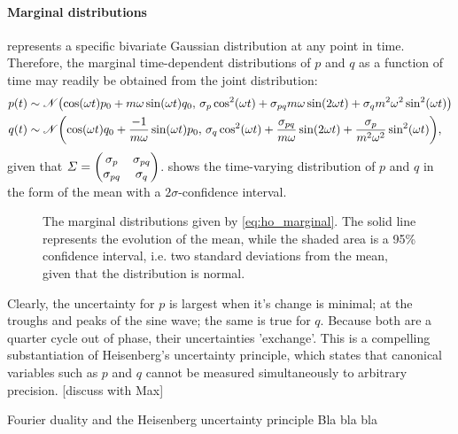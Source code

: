 \paragraph{Marginal distributions}  represents a specific bivariate Gaussian distribution at any point in time. Therefore, the marginal time-dependent distributions of $p$ and $q$ as a function of time may readily be obtained from the joint distribution: \cite{Schon2011}
\begin{equation}
    \begin{split}
        p(t) &\sim \mathscr{N}\qty(\cos(\omega t)p_0 + m\omega\sin(\omega t)q_0,\,\sigma_p\cos[2](\omega t) + \sigma_{pq}m\omega\sin(2\omega t) + \sigma_q m^2\omega^2\sin[2](\omega t)) \\
        q(t) &\sim \mathscr{N}\qty(\cos(\omega t)q_0 + \frac{-1}{m\omega}\sin(\omega t)p_0,\,\sigma_q\cos[2](\omega t) + \frac{\sigma_{pq}}{m\omega}\sin(2\omega t) + \frac{\sigma_p}{m^2\omega^2}\sin[2](\omega t)),
    \end{split}
    \label{eq:ho_marginal}
\end{equation}
given that $\Sigma = \mqty(\sigma_p & \sigma_{pq}\\\sigma_{pq} & \sigma_q)$.  shows the time-varying distribution of $p$ and $q$ in the form of the mean with a $2\sigma$-confidence interval.
\begin{figure}[h]
    \centering
    
    \caption{The marginal distributions given by \cref{eq:ho_marginal}. The solid line represents the evolution of the mean, while the shaded area is a 95\% confidence interval, i.e. two standard deviations from the mean, given that the distribution is normal.}
    \label{fig:pq_marginal_ho}
\end{figure}
Clearly, the uncertainty for $p$ is largest when it's change is minimal; at the troughs and peaks of the sine wave; the same is true for $q$. Because both are a quarter cycle out of phase, their uncertainties 'exchange'. This is a compelling substantiation of Heisenberg's uncertainty principle, which states that canonical variables such as $p$ and $q$ cannot be measured simultaneously to arbitrary precision. [discuss with Max]
\begin{aside}{Fourier duality and the Heisenberg uncertainty principle}
    Bla bla bla
\end{aside}

